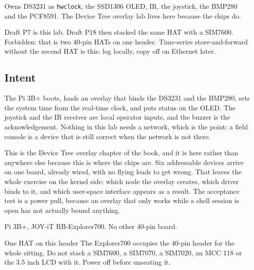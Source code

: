 
\begin{unique}
Owns DS3231 as \texttt{hwclock}, the SSD1306 OLED, IR, the joystick, the BMP280 and the PCF8591. The Device Tree overlay lab lives here because the chips do.
\end{unique}

\begin{blueprint}
Draft P7 is this lab. Draft P18 then stacked the same HAT with a SIM7600. Forbidden: that is two 40-pin HATs on one header. Time-series store-and-forward without the second HAT is this: log locally, copy off on Ethernet later.
\end{blueprint}

\subsection*{Intent}

The Pi 3B+ boots, loads an overlay that binds the DS3231 and the BMP280, sets the system time from the real-time clock, and puts status on the OLED. The joystick and the IR receiver are local operator inputs, and the buzzer is the acknowledgement. Nothing in this lab needs a network, which is the point: a field console is a device that is still correct when the network is not there.

This is the Device Tree overlay chapter of the book, and it is here rather than anywhere else because this is where the chips are. Six addressable devices arrive on one board, already wired, with no flying leads to get wrong. That leaves the whole exercise on the kernel side: which node the overlay creates, which driver binds to it, and which user-space interface appears as a result. The acceptance test is a power pull, because an overlay that only works while a shell session is open has not actually bound anything.

\begin{kit}
Pi 3B+, JOY-iT RB-Explorer700. No other 40-pin board.
\end{kit}

\begin{rulebox}{One HAT on this header}
The Explorer700 occupies the 40-pin header for the whole sitting. Do not stack a SIM7600, a SIM7070, a SIM7020, an MCC 118 or the 3.5 inch LCD with it. Power off before unseating it.
\end{rulebox}


